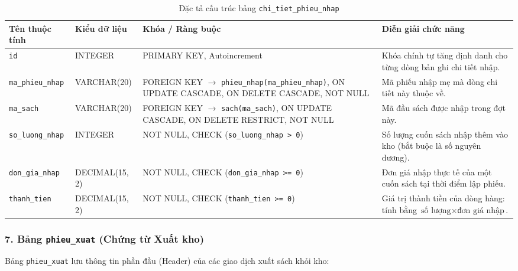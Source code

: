 \documentclass[12pt,a4paper]{article}
\begin{document}
\begin{table}[H]
\centering
\small
\renewcommand{\arraystretch}{1.2}
\begin{tabularx}{\textwidth}{|>{\raggedright\arraybackslash}p{3.0cm}|>{\raggedright\arraybackslash}p{2.6cm}|>{\raggedright\arraybackslash}p{3.8cm}|>{\raggedright\arraybackslash}X|}
\hline
\textbf{Tên thuộc tính} & \textbf{Kiểu dữ liệu} & \textbf{Khóa / Ràng buộc} & \textbf{Diễn giải chức năng} \\
\hline
\texttt{id} & INTEGER & PRIMARY KEY, Autoincrement & Khóa chính tự tăng định danh cho từng dòng bản ghi chi tiết nhập. \\
\hline
\texttt{ma\_phieu\_nhap} & VARCHAR(20) & FOREIGN KEY $\rightarrow$ \texttt{phieu\_nhap(ma\_phieu\_nhap)}, ON UPDATE CASCADE, ON DELETE CASCADE, NOT NULL & Mã phiếu nhập mẹ mà dòng chi tiết này thuộc về. \\
\hline
\texttt{ma\_sach} & VARCHAR(20) & FOREIGN KEY $\rightarrow$ \texttt{sach(ma\_sach)}, ON UPDATE CASCADE, ON DELETE RESTRICT, NOT NULL & Mã đầu sách được nhập trong đợt này. \\
\hline
\texttt{so\_luong\_nhap} & INTEGER & NOT NULL, CHECK (\texttt{so\_luong\_nhap > 0}) & Số lượng cuốn sách nhập thêm vào kho (bắt buộc là số nguyên dương). \\
\hline
\texttt{don\_gia\_nhap} & DECIMAL(15, 2) & NOT NULL, CHECK (\texttt{don\_gia\_nhap >= 0}) & Đơn giá nhập thực tế của một cuốn sách tại thời điểm lập phiếu. \\
\hline
\texttt{thanh\_tien} & DECIMAL(15, 2) & NOT NULL, CHECK (\texttt{thanh\_tien >= 0}) & Giá trị thành tiền của dòng hàng: tính bằng $\text{số lượng} \times \text{đơn giá nhập}$. \\
\hline
\end{tabularx}
\caption{Đặc tả cấu trúc bảng \texttt{chi\_tiet\_phieu\_nhap}}
\label{tab:csdl-ctpn}
\end{table}

\subsubsection*{7. Bảng \texttt{phieu\_xuat} (Chứng từ Xuất kho)}
Bảng \texttt{phieu\_xuat} lưu thông tin phần đầu (Header) của các giao dịch xuất sách khỏi kho:
\end{document}
